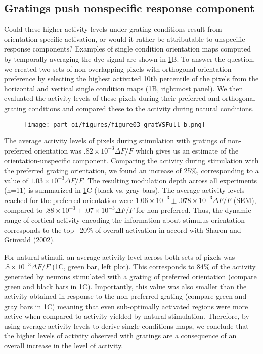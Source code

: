 
\subsection{Gratings push nonspecific response component} 


Could these higher activity levels under grating conditions result from
orientation-specific activation, or would it rather be attributable to
unspecific response components? Examples of single condition orientation
maps computed by temporally averaging the dye signal are shown in
\ref{GVSN}B.  To answer the question, we created two sets of
non-overlapping pixels with orthogonal orientation preference by selecting
the highest activated 10th percentile of the pixels from the horizontal and
vertical single condition maps (\ref{GVSN}B, rightmost panel). We then
evaluated the activity levels of these pixels during their preferred and
orthogonal grating conditions and compared these to the activity during
natural conditions.


\begin{figure}[!htb] \centerline{
\label{GVSN}\texttt{[image: part\_oi/figures/figure03\_gratVSFull\_b.png]}}
\caption{\protect}
\end{figure} 


The average activity levels of pixels during stimulation with gratings of
non-preferred orientation was $.82\times10^{-3} \Delta F/F$ which gives us
an estimate of the orientation-unspecific component. Comparing the activity
during stimulation with the preferred grating orientation, we found an
increase of 25\%, corresponding to a value of $1.03 \times10^{-3} \Delta
F/F$. The resulting modulation depth across all experiments (n=11) is
summarized in \ref{GVSN}C (black vs.  gray bars). The average activity
levels reached for the preferred orientation were $1.06 \times 10^{-3} \pm
.078\times10^{-3} \Delta F/F$  (SEM), compared to $.88 \times10^{-3} \pm
.07 \times10^{-3} \Delta F/F$ for non-preferred.  Thus, the dynamic range
of cortical activity encoding the information about stimulus orientation
corresponds to the top ~20\% of overall activation in accord with Sharon
and Grinvald (2002).

For natural stimuli, an average activity level across both sets of pixels
was $.8\times10^{-3} \Delta F/F$  (\ref{GVSN}C, green bar, left plot). This
corresponds to 84\% of the activity generated by neurons stimulated with a
grating of preferred orientation (compare green and black bars in
\ref{GVSN}C).  Importantly, this value was also smaller than the activity
obtained in response to the non-preferred grating (compare green and gray
bars in \ref{GVSN}C) meaning that even sub-optimally activated regions were
more active when compared to activity yielded by natural stimulation.
Therefore, by using average activity levels to derive single conditions
maps, we conclude that the higher levels of activity observed with gratings
are a consequence of an overall increase in the level of activity.

